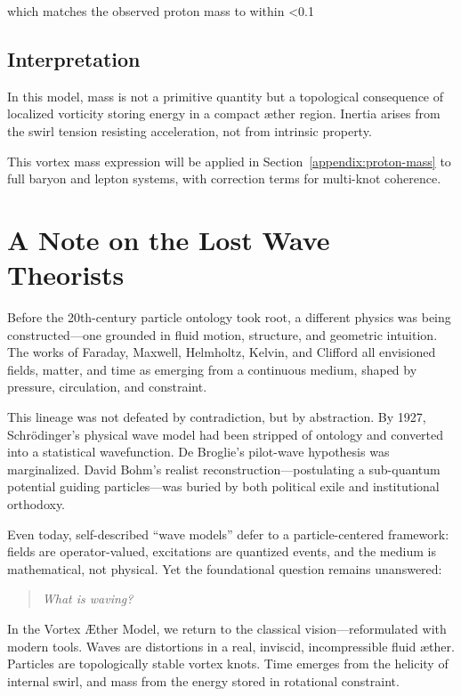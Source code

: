 which matches the observed proton mass to within \textless 0.1%

\subsection{Interpretation}

In this model, mass is not a primitive quantity but a topological consequence of localized vorticity storing energy in a compact æther region. Inertia arises from the swirl tension resisting acceleration, not from intrinsic property.

This vortex mass expression will be applied in Section~\ref{appendix:proton-mass} to full baryon and lepton systems, with correction terms for multi-knot coherence.


\section*{A Note on the Lost Wave Theorists}

Before the 20th-century particle ontology took root, a different physics was being constructed—one grounded in fluid motion, structure, and geometric intuition. The works of Faraday, Maxwell, Helmholtz, Kelvin, and Clifford all envisioned fields, matter, and time as emerging from a continuous medium, shaped by pressure, circulation, and constraint.

This lineage was not defeated by contradiction, but by abstraction. By 1927, Schrödinger’s physical wave model had been stripped of ontology and converted into a statistical wavefunction. De Broglie’s pilot-wave hypothesis was marginalized. David Bohm’s realist reconstruction—postulating a sub-quantum potential guiding particles—was buried by both political exile and institutional orthodoxy.

Even today, self-described “wave models” defer to a particle-centered framework: fields are operator-valued, excitations are quantized events, and the medium is mathematical, not physical. Yet the foundational question remains unanswered:

\begin{quote}
\textit{What is waving?}
\end{quote}

In the Vortex \AE ther Model, we return to the classical vision—reformulated with modern tools. Waves are distortions in a real, inviscid, incompressible fluid æther. Particles are topologically stable vortex knots. Time emerges from the helicity of internal swirl, and mass from the energy stored in rotational constraint.

